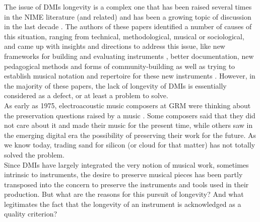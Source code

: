 The issue of DMIs longevity is a complex one that has been raised several times in the \gls{NIME} literature (and related) and has been a growing topic of discussion in the last decade \cite{baguyos_contemporary_2014}\cite{morreale_design_2017}. The authors of these papers identified a number of causes of this situation, ranging from technical, methodological, musical or sociological, and came up with insights and directions to address this issue, like new frameworks for building and evaluating instruments  \cite{jorda_digital_2004} \cite{morreale_design_2017}, better documentation, new pedagogical methods and forms of community-building as well as trying to establish musical notation and repertoire for these new instruments \cite{mamedes_composing_2014}\cite{mays_notation_2014}. However, in the majority of these papers, the lack of longevity of DMIs is essentially considered as a defect, or at least a problem to solve.\\
\indent As early as 1975, electroacoustic music composers at \gls{GRM} were thinking about the preservation questions raised by a music . Some composers said that they did not care about it and made their music for the present time, while others saw in the emerging digital era the possibility of preserving their work for the future. As we know today, trading sand for silicon (or cloud for that matter) has not totally solved the problem.\\
\indent Since DMIs have largely integrated the very notion of musical work, sometimes intrinsic to instruments, the desire to preserve musical pieces has been partly transposed into the concern to preserve the instruments and tools used in their production. But what are the reasons for this pursuit of longevity? And what legitimates the fact that the longevity of an instrument is acknowledged as a quality criterion? 

